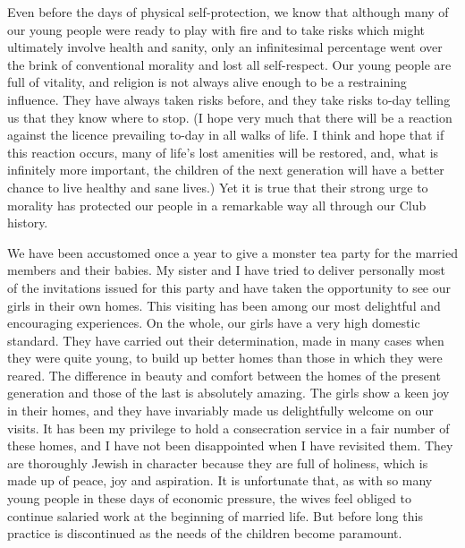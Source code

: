 Even before the days of physical self-protection, we
know that although many of our young people were ready
to play with fire and to take risks which might ultimately
involve health and sanity, only an infinitesimal percentage
went over the brink of conventional morality and lost
all self-respect. Our young people are full of vitality,
and religion is not always alive enough to be a restraining
influence. They have always taken risks before, and they
take risks to-day telling us that they know where to stop.
(I hope very much that there will be a reaction against
the licence prevailing to-day in all walks of life. I think
and hope that if this reaction occurs, many of life’s lost
amenities will be restored, and, what is infinitely more
important, the children of the next generation will have a
better chance to live healthy and sane lives.) Yet it is true
that their strong urge to morality has protected our people
in a remarkable way all through our Club history.

We have been accustomed once a year to give a
monster tea party for the married members and their
babies. My sister and I have tried to deliver personally
most of the invitations issued for this party and have
taken the opportunity to see our girls in their own homes.
This visiting has been among our most delightful and
encouraging experiences. On the whole, our girls have a
very high domestic standard. They have carried out
their determination, made in many cases when they
were quite young, to build up better homes than those in
which they were reared. The difference in beauty and
comfort between the homes of the present generation and
those of the last is absolutely amazing. The girls show
a keen joy in their homes, and they have invariably made
us delightfully welcome on our visits. It has been my
privilege to hold a consecration service in a fair number
of these homes, and I have not been disappointed when
I have revisited them. They are thoroughly Jewish in
character because they are full of holiness, which is made
up of peace, joy and aspiration. It is unfortunate that,
as with so many young people in these days of economic
pressure, the wives feel obliged to continue salaried work
at the beginning of married life. But before long this
practice is discontinued as the needs of the children
become paramount.


